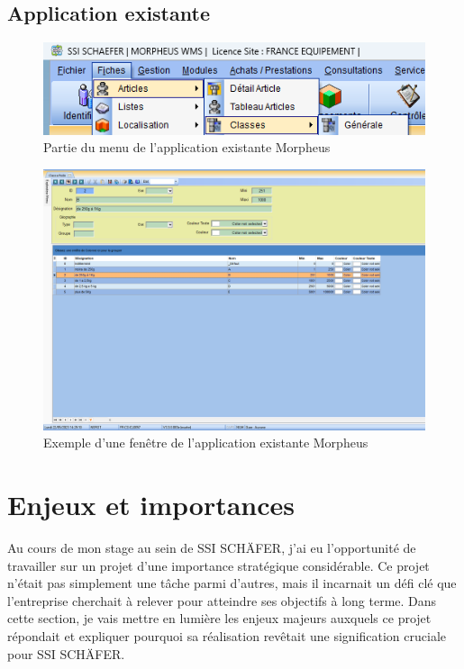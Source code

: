 \documentclass[a4paper, 12pt, french]{article}
\begin{document}
		\subsection{Application existante}%
		
				\begin{figure}[h!]
					\begin{center}
						\includegraphics[width=0.7\linewidth]{images/mph_menu.png}
					\end{center}
					\caption{Partie du menu de l'application existante Morpheus}
					\label{fig:mph_menu}
				\end{figure}

				\begin{figure}[h!]
					\begin{center}
						\includegraphics[width=0.7\linewidth]{images/mph_window.png}
					\end{center}
					\caption{Exemple d'une fenêtre de l'application existante Morpheus}
					\label{fig:mph_window}
				\end{figure}
		
		\newpage
		
		\section{Enjeux et importances}
			Au cours de mon stage au sein de SSI SCHÄFER, j'ai eu l'opportunité de travailler sur un projet d'une importance stratégique considérable. Ce projet n'était pas simplement une tâche parmi d'autres, mais il incarnait un défi clé que l'entreprise cherchait à relever pour atteindre ses objectifs à long terme. Dans cette section, je vais mettre en lumière les enjeux majeurs auxquels ce projet répondait et expliquer pourquoi sa réalisation revêtait une signification cruciale pour SSI SCHÄFER.\\
\end{document}
